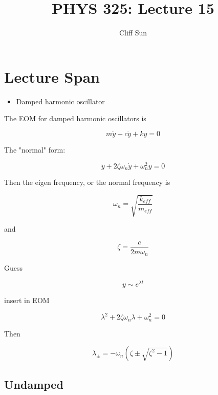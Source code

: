 \documentclass{article}
\title{PHYS 325: Lecture 15}
\author{Cliff Sun}
\newtheorem{one minute paper}[theorem]{One Minute Paper}
\begin{document}
\maketitle

\section*{Lecture Span}
\begin{itemize}
    \item Damped harmonic oscillator
\end{itemize}

The EOM for damped harmonic oscillators is 

\begin{equation}
    m\ddot{y} + c\dot{y} + ky = 0
\end{equation}

The "normal" form:

\begin{equation}
    \ddot{y} + 2\zeta\omega_n\dot{y} + \omega_n^2y = 0
\end{equation}

Then the eigen frequency, or the normal frequency is 

\begin{equation}
    \omega_n = \sqrt{\frac{k_{eff}}{m_{eff}}}
\end{equation}

and 

\begin{equation}
    \zeta = \frac{c}{2m\omega_n}
\end{equation}

Guess 

\begin{equation}
    y \sim e^{\lambda t}
\end{equation}

insert in EOM

\begin{equation}
    \lambda^2 + 2\zeta\omega_n\lambda + \omega_n^2 = 0
\end{equation}

Then 

\begin{equation}
    \lambda_\pm = -\omega_n(\zeta \pm \sqrt{\zeta^2 -1})
\end{equation}

\subsection*{Undamped}
\end{document}
